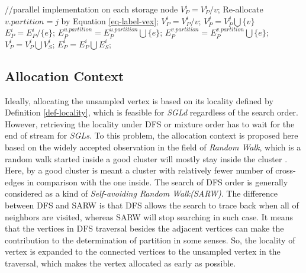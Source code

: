 \documentclass{sig-alternate-2013}
\begin{document}
\begin{algorithm}[h]
\begin{algorithmic}[1]
\STATE //parallel implementation on each storage node
            \STATE $V_P^i=V_P^i/v$; \label {alg-sgl-stream-clean-storage-node}
        \ELSE
             \label{alg-sgl-stream-ac-change-begin}
                \STATE Re-allocate $v.partition = j$ by Equation \ref{eq-label-vex};
                \STATE $V_P^i = V_P^i/v$; $V_P^j=V_P^j\bigcup \{v\}$
            \ENDIF \label{alg-sgl-stream-ac-change-end}
        \ENDIF
    \ENDFOR
     \label{alg-sgl-stream-fix-EP-begin}
            \STATE $E_P^i=E_P^i/\{e\}$;
            \STATE $E_P^{u.partition}=E_P^{u.partition}\bigcup\{e\}$;
            \STATE $E_P^{v.partition}=E_P^{v.partition}\bigcup\{e\}$;
        \ENDIF
    \ENDFOR
    \STATE $V_P^i=V_P^i\bigcup V_S^i$; $E_P^i=E_P^i\bigcup E_S^i$; \label{alg-sgl-stream-fix-EP-end}
\ENDFOR
\end{algorithmic}
\end{algorithm}

\subsection {Allocation Context}\label{ch-sgls-ac}

Ideally, allocating the unsampled vertex is based on its locality defined by Definition \ref{def-locality}, which is feasible for \textit{SGLd} regardless of the search order. However, retrieving the locality under DFS or mixture order has to wait for the end of stream for \textit{SGLs}.
To this problem, the allocation context is proposed here based on the widely accepted observation in the field of \textit{Random Walk}, which is a random walk started inside a good cluster will mostly stay inside the cluster \cite{DBLP:books/sp/social11}. Here, by a good cluster is meant a cluster with relatively fewer number of cross-edges in comparison with the one inside.
The search of DFS order is generally considered as a kind of \textit{Self-avoiding Random Walk(SARW)}. The difference between DFS and SARW is that DFS allows the search to trace back when all of neighbors are visited, whereas SARW will stop searching in such case. It means that the vertices in DFS traversal besides the adjacent vertices can make the contribution to the determination of partition in some senses. So, the locality of vertex is expanded to the connected vertices to the unsampled vertex in the traversal, which makes the vertex allocated as early as possible.
\end{document}
